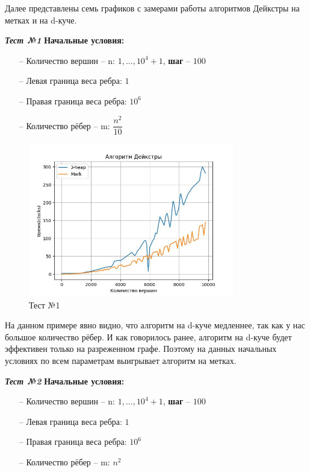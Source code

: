 \begin{text}
Далее представлены семь графиков с замерами работы алгоритмов Дейкстры на метках и на d-куче.\\

\begin{center}
\textbf{\textit{Тест №1}}
\textbf{Начальные условия:}

\begin{enumerate}
	\item[--] Количество вершин -- n: $1,...,10^4 + 1$, \textbf{шаг} -- $100$
	\item[--] Левая граница веса ребра: $1$
	\item[--] Правая граница веса ребра: $10^6$
	\item[--] Количество рёбер -- m: $\dfrac{n^2}{10}$ 
\end{enumerate}

\end{center}
\begin{figure}[h]
  \centering
  \includegraphics[width=0.8\textwidth]{pictures/1.jpeg}
  \caption{Тест №1}
  \label{fig:pict_1}
\end{figure}

	На данном примере явно видно, что алгоритм на d-куче медленнее, так как у нас большое количество рёбер. И как говорилось ранее, алгоритм на d-куче будет эффективен только на разреженном графе. Поэтому на данных начальных условиях по всем параметрам выигрывает алгоритм на метках.\\
	
\begin{center}
\textbf{\textit{Тест №2}}
\textbf{Начальные условия:}

\begin{enumerate}
	\item[--] Количество вершин -- n: $1,...,10^4 + 1$, \textbf{шаг} -- $100$
	\item[--] Левая граница веса ребра: $1$
	\item[--] Правая граница веса ребра: $10^6$
	\item[--] Количество рёбер -- m: $n^2$ 
\end{enumerate}


\end{center}
\end{text}
